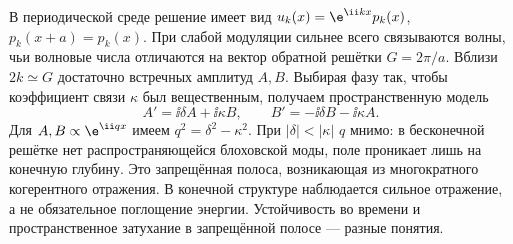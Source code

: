 
В периодической среде решение имеет вид $u_k(x)=\e^{\ii kx}p_k(x)$, $p_k(x+a)=p_k(x)$. При слабой модуляции сильнее всего связываются волны, чьи волновые числа отличаются на вектор обратной решётки $G=2\pi/a$. Вблизи $2k\simeq G$ достаточно встречных амплитуд $A,B$. Выбирая фазу так, чтобы коэффициент связи $\kappa$ был вещественным, получаем пространственную модель
\begin{equation}
 A'=\ii\delta A+\ii\kappa B,\qquad
 B'=-\ii\delta B-\ii\kappa A.
\end{equation}
Для $A,B\propto\e^{\ii qx}$ имеем $q^2=\delta^2-\kappa^2$. При $|\delta|<|\kappa|$ $q$ мнимо: в бесконечной решётке нет распространяющейся блоховской моды, поле проникает лишь на конечную глубину. Это запрещённая полоса, возникающая из многократного когерентного отражения. В конечной структуре наблюдается сильное отражение, а не обязательное поглощение энергии. Устойчивость во времени и пространственное затухание в запрещённой полосе — разные понятия.
